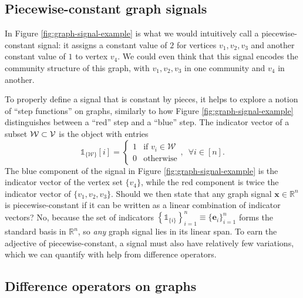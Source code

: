 \subsection{Piecewise-constant graph signals}\label{sec:piece_const_graph_signals}

In Figure \ref{fig:graph-signal-example} is what we would intuitively call a piecewise-constant signal: it assigns a constant value of $2$ for vertices $v_1, v_2, v_3$ and another constant value of $1$ to vertex $v_4$. We could even think that this signal encodes the community structure of this graph, with $v_1, v_2, v_3$ in one community and $v_4$ in another.

To properly define a signal that is constant by pieces, it helps to explore a notion of ``step functions'' on graphs, similarly to how Figure \ref{fig:graph-signal-example} distinguishes between a ``red'' step and a ``blue'' step. The indicator vector of a subset $\mathcal{W} \subset \mathcal{V}$ is the object with entries
\begin{equation}
    \mathbb{1}_{\{ \mathcal{W} \}}[i] = \left \{
        \begin{matrix}
            1 & \text{if } v_i \in \mathcal{W} \\
            0 & \text{otherwise}
        \end{matrix}
    \right.
    , \enspace \forall i \in [n].
\end{equation}
The blue component of the signal in Figure \ref{fig:graph-signal-example} is the indicator vector of the vertex set $\{v_4\}$, while the red component is twice the indicator vector of $\{v_1, v_2, v_3\}$. Should we then state that any graph signal $\mathbf{x} \in \mathbb{R}^{n}$ is piecewise-constant if it can be written as a linear combination of indicator vectors? No, because the set of indicators $\left\{ \mathbb{1}_{\{ i \}} \right\}_{i=1}^n \equiv \{\mathbf{e}_i\}_{i=1}^n$ forms the standard basis in $\mathbb{R}^{n}$, so \emph{any} graph signal lies in its linear span. To earn the adjective of piecewise-constant, a signal must also have relatively few variations, which we can quantify with help from difference operators.


\subsection{Difference operators on graphs}\label{sec:diff_op_graphs}

